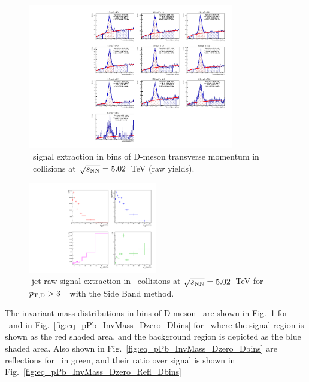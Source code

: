 \begin{figure}[H]%
\centering
\includegraphics[width=0.8\textwidth]{pPbplots/plotsSB_noEff_pt3_noDetails/invMass_FASTwoSDD_pTD3}
\caption{\Dstar\ signal extraction in bins of D-meson transverse momentum in \pPb\ collisions at $\sqrt{s_{\rm NN}}=5.02$~TeV (raw yields).}
\label{fig:eq_pPb_InvMass_Dstar_Dbins}
\end{figure}

\begin{figure}[bth]
\centering
\includegraphics[width=0.5\textwidth]{pPbplots/plotsSB_noEff_pt3_noDetails/signalParams_FASTwoSDD_pTD3}
\caption{\Dstar-jet raw signal extraction in \pPb\ collisions at $\sqrt{s_{\rm NN}}=5.02$~TeV for $p_{\mathrm{T,D}}>3$~\GeVc\ with the Side Band method.}
\label{fig:eq_pPb_RSU_raw_Dbins_Dstar}
\end{figure}

The invariant mass distributions in bins of D-meson \pt\ are shown in Fig.~\ref{fig:eq_pPb_InvMass_Dstar_Dbins} for \Dstar\ and in Fig.~\ref{fig:eq_pPb_InvMass_Dzero_Dbins} for \Dzero\ where 
the signal region is shown as the red shaded area, and
the background region is depicted as the blue shaded area.
Also shown in Fig.~\ref{fig:eq_pPb_InvMass_Dzero_Dbins} are reflections for \Dzero\ in green, and their ratio over signal is shown in Fig.~\ref{fig:eq_pPb_InvMass_Dzero_Refl_Dbins}


